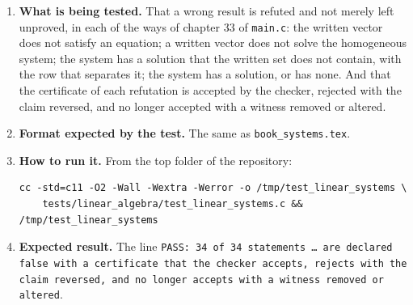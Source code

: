 \documentclass[11pt,a4paper]{article}
\begin{document}
\begin{enumerate}
\item \textbf{What is being tested.} That a wrong result is refuted and not merely left unproved, in each of the ways of chapter 33 of \texttt{main.c}: the written vector does not satisfy an equation; a written vector does not solve the homogeneous system; the system has a solution that the written set does not contain, with the row that separates it; the system has a solution, or has none. And that the certificate of each refutation is accepted by the checker, rejected with the claim reversed, and no longer accepted with a witness removed or altered.

\item \textbf{Format expected by the test.} The same as \texttt{book\_systems.tex}.

\item \textbf{How to run it.} From the top folder of the repository:
\begin{verbatim}
cc -std=c11 -O2 -Wall -Wextra -Werror -o /tmp/test_linear_systems \
    tests/linear_algebra/test_linear_systems.c && /tmp/test_linear_systems
\end{verbatim}

\item \textbf{Expected result.} The line \texttt{PASS: 34 of 34 statements \dots{} are declared false with a certificate that the checker accepts, rejects with the claim reversed, and no longer accepts with a witness removed or altered}.
\end{enumerate}
\end{document}
